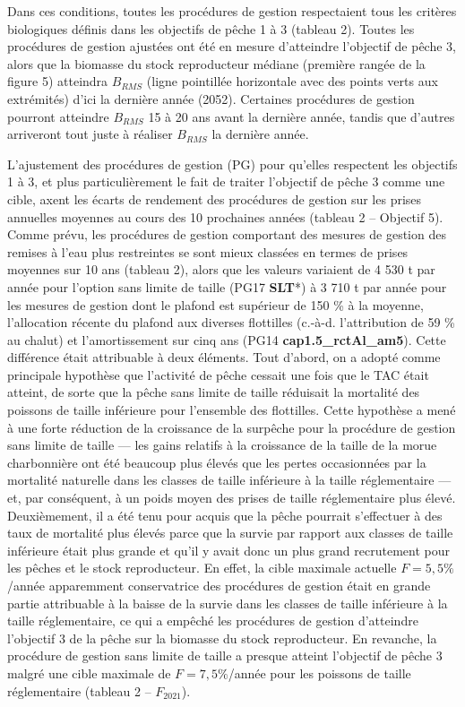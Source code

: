 \documentclass[11pt]{book}
\begin{document}
Dans ces conditions, toutes les procédures de gestion respectaient tous les critères biologiques définis dans les objectifs de pêche 1 à 3 (tableau 2). Toutes les procédures de gestion ajustées ont été en mesure d'atteindre l'objectif de pêche 3, alors que la biomasse du stock reproducteur médiane (première rangée de la figure 5) atteindra \(B_{RMS}\) (ligne pointillée horizontale avec des points verts aux extrémités) d'ici la dernière année (2052). Certaines procédures de gestion pourront atteindre \(B_{RMS}\) 15 à 20 ans avant la dernière année, tandis que d'autres arriveront tout juste à réaliser \(B_{RMS}\) la dernière année.

L'ajustement des procédures de gestion (PG) pour qu'elles respectent les objectifs 1 à 3, et plus particulièrement le fait de traiter l'objectif de pêche 3 comme une cible, axent les écarts de rendement des procédures de gestion sur les prises annuelles moyennes au cours des 10 prochaines années (tableau 2 -- Objectif 5). Comme prévu, les procédures de gestion comportant des mesures de gestion des remises à l'eau plus restreintes se sont mieux classées en termes de prises moyennes sur 10 ans (tableau 2), alors que les valeurs variaient de 4 530 t par année pour l'option sans limite de taille (PG17 \textbf{SLT}*) à 3 710 t par année pour les mesures de gestion dont le plafond est supérieur de 150 \% à la moyenne, l'allocation récente du plafond aux diverses flottilles (c.-à-d. l'attribution de 59 \% au chalut) et l'amortissement sur cinq ans (PG14 \textbf{cap1.5\_rctAl\_am5}). Cette différence était attribuable à deux éléments. Tout d'abord, on a adopté comme principale hypothèse que l'activité de pêche cessait une fois que le TAC était atteint, de sorte que la pêche sans limite de taille réduisait la mortalité des poissons de taille inférieure pour l'ensemble des flottilles. Cette hypothèse a mené à une forte réduction de la croissance de la surpêche pour la procédure de gestion sans limite de taille --- les gains relatifs à la croissance de la taille de la morue charbonnière ont été beaucoup plus élevés que les pertes occasionnées par la mortalité naturelle dans les classes de taille inférieure à la taille réglementaire --- et, par conséquent, à un poids moyen des prises de taille réglementaire plus élevé. Deuxièmement, il a été tenu pour acquis que la pêche pourrait s'effectuer à des taux de mortalité plus élevés parce que la survie par rapport aux classes de taille inférieure était plus grande et qu'il y avait donc un plus grand recrutement pour les pêches et le stock reproducteur. En effet, la cible maximale actuelle \(F=5,5\%\)/année apparemment conservatrice des procédures de gestion était en grande partie attribuable à la baisse de la survie dans les classes de taille inférieure à la taille réglementaire, ce qui a empêché les procédures de gestion d'atteindre l'objectif 3 de la pêche sur la biomasse du stock reproducteur. En revanche, la procédure de gestion sans limite de taille a presque atteint l'objectif de pêche 3 malgré une cible maximale de \(F=7,5 \%\)/année pour les poissons de taille réglementaire (tableau 2 -- \(F_{2021}\)).
\end{document}
